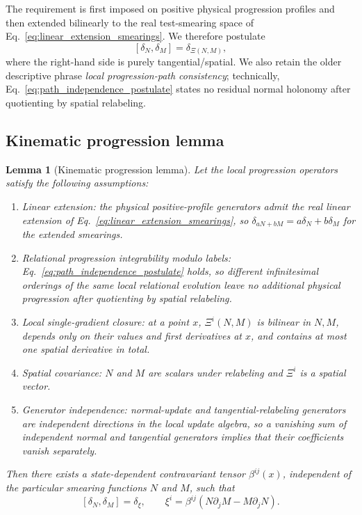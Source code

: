 \documentclass[11pt]{article}
\newtheorem{lemma}{Lemma}
\begin{document}
The requirement is first imposed on positive physical progression profiles and then extended bilinearly to the real test-smearing space of Eq.~\eqref{eq:linear_extension_smearings}. We therefore postulate
\begin{equation}
    \boxed{[\delta_N,\delta_M]=\delta_{\Xi(N,M)},}
    \label{eq:path_independence_postulate}
\end{equation}
where the right-hand side is purely tangential/spatial. We also retain the older descriptive phrase \emph{local progression-path consistency}; technically, Eq.~\eqref{eq:path_independence_postulate} states no residual normal holonomy after quotienting by spatial relabeling.

\subsection{Kinematic progression lemma}

\begin{lemma}[Kinematic progression lemma]
Let the local progression operators satisfy the following assumptions:
\begin{enumerate}[label=(\alph*)]
    \item \emph{Linear extension:} the physical positive-profile generators admit the real linear extension of Eq.~\eqref{eq:linear_extension_smearings}, so $\delta_{aN+bM}=a\delta_N+b\delta_M$ for the extended smearings.
    \item \emph{Relational progression integrability modulo labels:} Eq.~\eqref{eq:path_independence_postulate} holds, so different infinitesimal orderings of the same local relational evolution leave no additional physical progression after quotienting by spatial relabeling.
    \item \emph{Local single-gradient closure:} at a point $x$, $\Xi^i(N,M)$ is bilinear in $N,M$, depends only on their values and first derivatives at $x$, and contains at most one spatial derivative in total.
    \item \emph{Spatial covariance:} $N$ and $M$ are scalars under relabeling and $\Xi^i$ is a spatial vector.
    \item \emph{Generator independence:} normal-update and tangential-relabeling generators are independent directions in the local update algebra, so a vanishing sum of independent normal and tangential generators implies that their coefficients vanish separately.
\end{enumerate}
Then there exists a state-dependent contravariant tensor $\beta^{ij}(x)$, independent of the particular smearing functions $N$ and $M$, such that
\begin{equation}
    \boxed{
    [\delta_N,\delta_M]
    =\delta_{\xi},\qquad
    \xi^i=\beta^{ij}
    \left(N\partial_jM-M\partial_jN\right).}
    \label{eq:kinematic_lemma}
\end{equation}
\end{lemma}
\end{document}
